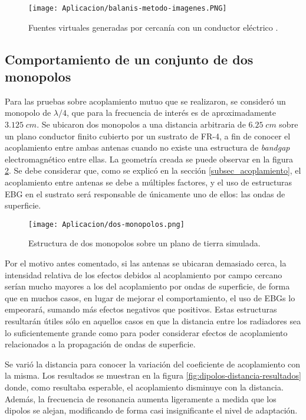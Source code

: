 \begin{figure}[H]
	\centering
	\texttt{[image: Aplicacion/balanis-metodo-imagenes.PNG]}
	\caption{Fuentes virtuales generadas por cercanía con un conductor eléctrico \cite{Balanis:Theory}.}
	\label{fig:fuentes-virtuales}
\end{figure}

\subsection{Comportamiento de un conjunto de dos monopolos}

Para las pruebas sobre acoplamiento mutuo que se realizaron, se consideró un monopolo de $\lambda/4$, que para la frecuencia de interés es de aproximadamente $3.125\;cm$. Se ubicaron dos monopolos a una distancia arbitraria de $6.25\; cm$ sobre un plano conductor finito cubierto por un sustrato de FR-4, a fin de conocer el acoplamiento entre ambas antenas cuando no existe una estructura de \textit{bandgap} electromagnético entre ellas. La geometría creada se puede observar en la figura \ref{fig:dos-monopolos}. Se debe considerar que, como se explicó en la sección \ref{subsec_acoplamiento}, el acoplamiento entre antenas se debe a múltiples factores, y el uso de estructuras EBG en el sustrato será responsable de únicamente uno de ellos: las ondas de superficie.

\begin{figure}[H]
	\centering
	\texttt{[image: Aplicacion/dos-monopolos.png]}
	\caption{Estructura de dos monopolos sobre un plano de tierra simulada.}
	\label{fig:dos-monopolos}
\end{figure}

Por el motivo antes comentado, si las antenas se ubicaran demasiado cerca, la intensidad relativa de los efectos debidos al acoplamiento por campo cercano serían mucho mayores a los del acoplamiento por ondas de superficie, de forma que en muchos casos, en lugar de mejorar el comportamiento, el uso de EBGs lo empeorará, sumando más efectos negativos que positivos. Estas estructuras resultarán útiles sólo en aquellos casos en que la distancia entre los radiadores sea lo suficientemente grande como para poder considerar efectos de acoplamiento relacionados a la propagación de ondas de superficie.

Se varió la distancia para conocer la variación del coeficiente de acoplamiento con la misma. Los resultados se muestran en la figura \ref{fig:dipolos-distancia-resultados} donde, como resultaba esperable, el acoplamiento disminuye con la distancia. Además, la frecuencia de resonancia aumenta ligeramente a medida que los dipolos se alejan, modificando de forma casi insignificante el nivel de adaptación.


